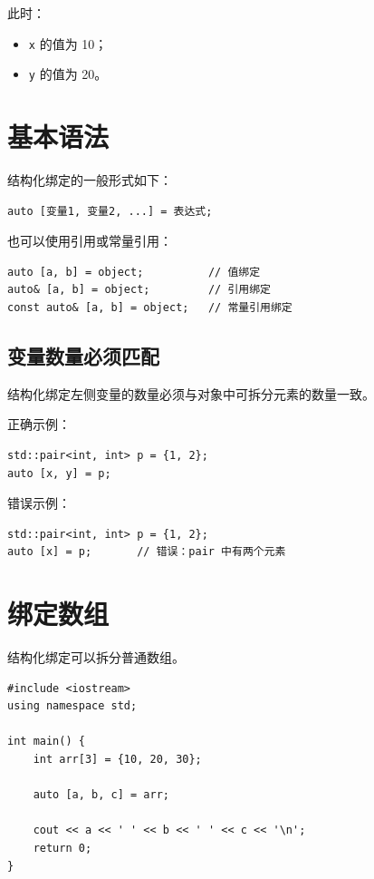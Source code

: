 \documentclass[UTF8,12pt,a4paper]{ctexart}
\begin{document}
此时：

\begin{itemize}
    \item \texttt{x} 的值为 10；
    \item \texttt{y} 的值为 20。
\end{itemize}

\section{基本语法}

结构化绑定的一般形式如下：

\begin{lstlisting}
auto [变量1, 变量2, ...] = 表达式;
\end{lstlisting}

也可以使用引用或常量引用：

\begin{lstlisting}
auto [a, b] = object;          // 值绑定
auto& [a, b] = object;         // 引用绑定
const auto& [a, b] = object;   // 常量引用绑定
\end{lstlisting}

\subsection{变量数量必须匹配}

结构化绑定左侧变量的数量必须与对象中可拆分元素的数量一致。

正确示例：

\begin{lstlisting}
std::pair<int, int> p = {1, 2};
auto [x, y] = p;
\end{lstlisting}

错误示例：

\begin{lstlisting}
std::pair<int, int> p = {1, 2};
auto [x] = p;       // 错误：pair 中有两个元素
\end{lstlisting}

\section{绑定数组}

结构化绑定可以拆分普通数组。

\begin{lstlisting}
#include <iostream>
using namespace std;

int main() {
    int arr[3] = {10, 20, 30};

    auto [a, b, c] = arr;

    cout << a << ' ' << b << ' ' << c << '\n';
    return 0;
}
\end{lstlisting}
\end{document}
